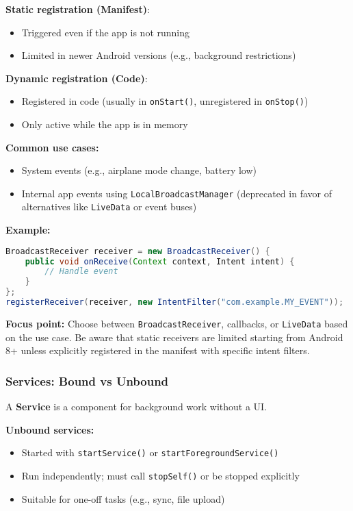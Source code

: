 \documentclass[a4paper,12pt]{article}
\begin{document}
\textbf{Static registration (Manifest)}:
\begin{itemize}
  \item Triggered even if the app is not running
  \item Limited in newer Android versions (e.g., background restrictions)
\end{itemize}

\textbf{Dynamic registration (Code)}:
\begin{itemize}
  \item Registered in code (usually in \texttt{onStart()}, unregistered in \texttt{onStop()})
  \item Only active while the app is in memory
\end{itemize}

\textbf{Common use cases:}
\begin{itemize}
  \item System events (e.g., airplane mode change, battery low)
  \item Internal app events using \texttt{LocalBroadcastManager} (deprecated in favor of alternatives like \texttt{LiveData} or event buses)
\end{itemize}

\textbf{Example:}
\begin{lstlisting}[language=Java]
BroadcastReceiver receiver = new BroadcastReceiver() {
    public void onReceive(Context context, Intent intent) {
        // Handle event
    }
};
registerReceiver(receiver, new IntentFilter("com.example.MY_EVENT"));
\end{lstlisting}

\textbf{Focus point:} Choose between \texttt{BroadcastReceiver}, callbacks, or \texttt{LiveData} based on the use case. Be aware that static receivers are limited starting from Android 8+ unless explicitly registered in the manifest with specific intent filters.

\subsubsection{Services: Bound vs Unbound}

A \textbf{Service} is a component for background work without a UI.

\textbf{Unbound services:}
\begin{itemize}
  \item Started with \texttt{startService()} or \texttt{startForegroundService()}
  \item Run independently; must call \texttt{stopSelf()} or be stopped explicitly
  \item Suitable for one-off tasks (e.g., sync, file upload)
\end{itemize}
\end{document}
